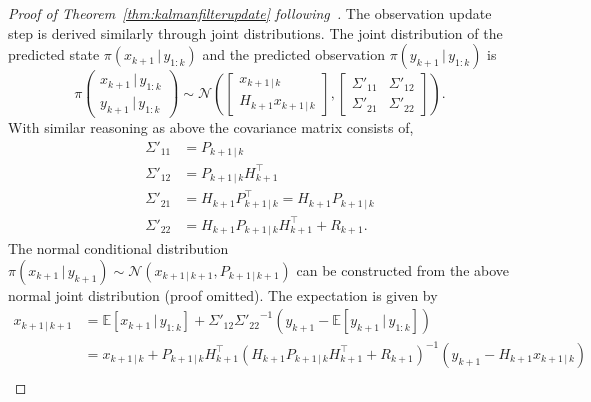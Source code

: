 \begin{proof}[Proof of Theorem~\ref{thm:kalmanfilterupdate} following~\cite{sarkka}]
    The observation update step is derived similarly through joint distributions.
    The joint distribution of the predicted state $\pi(x_{k+1} \, \vert \, y_{1:k})$ and the predicted observation $\pi(y_{k+1} \, \vert \, y_{1:k})$ is
    \begin{equation*}
        \pi \left(
            \begin{matrix}
                x_{k+1} \, \vert \, y_{1:k}\\
                y_{k+1} \, \vert \, y_{1:k}
            \end{matrix}
            \right) \sim \mathcal{N} \left(
                \begin{bmatrix}
                    x_{k+1 \, \vert \, k}\\
                    H_{k+1} x_{k+1 \, \vert \, k}
                \end{bmatrix},
                \begin{bmatrix}
                    \Sigma'_{11} & \Sigma'_{12} \\
                    \Sigma'_{21} & \Sigma'_{22}
                \end{bmatrix} \right).
    \end{equation*}
    With similar reasoning as above the covariance matrix consists of,
    \begin{align*}
        \Sigma'_{11} &= P_{k+1 \, \vert \, k}\\
        \Sigma'_{12} &= P_{k+1 \, \vert \, k} H_{k+1}^{\top}\\
        \Sigma'_{21} &= H_{k+1} P_{k+1 \, \vert \, k}^{\top}= H_{k+1} P_{k+1 \, \vert \, k}\\
        \Sigma'_{22} &= H_{k+1} P_{k+1 \, \vert \, k} H_{k+1}^{\top} + R_{k+1}.
    \end{align*}
    The normal conditional distribution $\pi(x_{k+1} \, \vert \, y_{k+1}) \sim \mathcal{N}(x_{k+1\,\vert\,k+1},  P_{k+1 \, \vert \, k+1})$ can be constructed from the above normal joint distribution (proof omitted).
    The expectation is given by
    \begin{align*}
        x_{k+1\,\vert\,k+1} &=\mathbb{E}[x_{k+1} \, \vert \,  y_{1:k}] + \Sigma'_{12} {\Sigma'_{22}}^{-1}(y_{k+1} - \mathbb{E}[ y_{k+1} \, \vert \, y_{1:k}])\\
                                                &= x_{k+1 \, \vert \, k} + P_{k+1 \, \vert \, k} H_{k+1}^{\top} (H_{k+1} P_{k+1 \, \vert \, k} H_{k+1}^{\top} + R_{k+1})^{-1} (y_{k+1} - H_{k+1}x_{k+1 \, \vert \, k})\\

\end{align*}
\end{proof}
